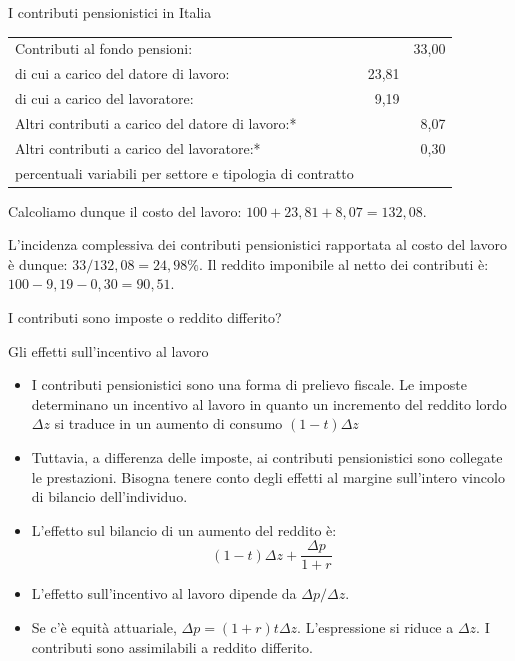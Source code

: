 \documentclass[11pt]{beamer}
\begin{document}
\begin{frame}{I contributi pensionistici in Italia}
\begin{center}
\begin{tabular}{lrr}
\toprule
Contributi al fondo pensioni: && 33,00 \\
\qquad di cui a carico del datore di lavoro: & 23,81 &\\
\qquad di cui a carico del lavoratore: & 9,19 &\\
Altri contributi a carico del datore di lavoro:* && 8,07 \\
Altri contributi a carico del lavoratore:* && 0,30 \\
\bottomrule\footnotesize * percentuali variabili per settore e tipologia di contratto&&\\
\end{tabular}
\end{center}

Calcoliamo dunque il costo del lavoro: \(100 + 23,81 + 8,07 = 132,08\).

L'incidenza complessiva dei contributi pensionistici rapportata al
costo del lavoro è dunque: \(33/132,08 = 24,98\%\). Il reddito imponibile al netto dei contributi è: \(100 - 9,19 - 0,30 = 90,51\).

\alert{I contributi sono imposte o reddito differito?}
\end{frame}

\begin{frame}{Gli effetti sull'incentivo al lavoro}
\begin{itemize}
\item I contributi pensionistici sono una forma di prelievo fiscale. Le imposte
determinano un incentivo al lavoro in quanto un incremento del reddito lordo
\(\Delta z\) si traduce in un aumento di consumo \((1-t)\Delta z\)
\item Tuttavia, a differenza delle imposte, ai contributi pensionistici sono
collegate le prestazioni. Bisogna tenere conto degli effetti \alert{al margine}
sull'intero vincolo di bilancio dell'individuo.
\item L'effetto sul bilancio di un aumento del reddito è:
\begin{equation*}
  (1-t)\Delta z +\frac{\Delta p}{1+r} 
\end{equation*}
\item L'effetto sull'incentivo al lavoro dipende da \(\Delta p/\Delta z\).
\item Se c'è equità attuariale, \(\Delta p=(1+r)t\Delta z\). L'espressione si riduce
a \(\Delta z\). I contributi sono assimilabili a \alert{reddito differito}.
\end{itemize}
\end{frame}
\end{document}
